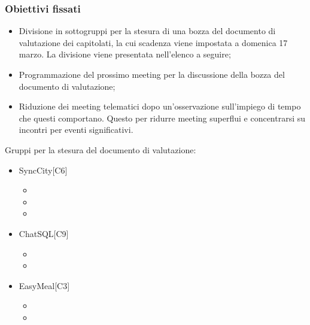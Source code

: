 \subsubsection{Obiettivi fissati}
\begin{itemize}
	\item Divisione in sottogruppi per la stesura di una bozza del documento di valutazione dei capitolati, la cui scadenza viene impostata a domenica 17 marzo. La divisione viene presentata nell'elenco a seguire;
	\item Programmazione del prossimo meeting per la discussione della bozza del documento di valutazione;
	\item Riduzione dei meeting telematici dopo un’osservazione sull’impiego di tempo che questi comportano. Questo per ridurre meeting superflui e concentrarsi su incontri per eventi significativi.
\end{itemize}
Gruppi per la stesura del documento di valutazione:
\begin{itemize}
	\item SyncCity[C6]
	\begin{itemize}
		\item \mattia
		\item \marco
		\item \tommaso
	\end{itemize}
	\item ChatSQL[C9]\begin{itemize}
		\item \sebastiano
		\item \martina
	\end{itemize}
	\item EasyMeal[C3]
	\begin{itemize}
		\item \raul
		\item \riccardo
	\end{itemize}
\end{itemize}